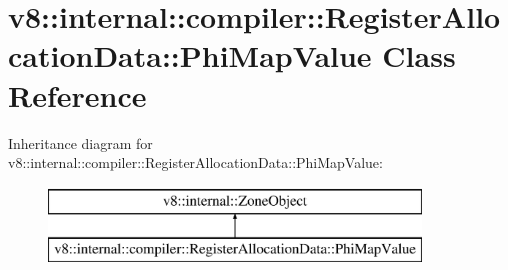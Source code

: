 \hypertarget{classv8_1_1internal_1_1compiler_1_1_register_allocation_data_1_1_phi_map_value}{}\section{v8\+:\+:internal\+:\+:compiler\+:\+:Register\+Allocation\+Data\+:\+:Phi\+Map\+Value Class Reference}
\label{classv8_1_1internal_1_1compiler_1_1_register_allocation_data_1_1_phi_map_value}
Inheritance diagram for v8\+:\+:internal\+:\+:compiler\+:\+:Register\+Allocation\+Data\+:\+:Phi\+Map\+Value\+:\begin{figure}[H]
\begin{center}
\leavevmode
\includegraphics[height=2.000000cm]{classv8_1_1internal_1_1compiler_1_1_register_allocation_data_1_1_phi_map_value}
\end{center}
\end{figure}
